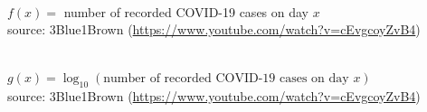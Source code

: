 \documentclass{beamer}
\renewcommand{\alert}[1]{\textcolor{MyTeal}{#1}}
\begin{document}
  \begin{frame}
    \begin{center}
      \\
      $f(x) = $ number of recorded COVID-19 cases on day $x$\\
      \alert{source:} 3Blue1Brown {\tiny (\url{https://www.youtube.com/watch?v=cEvgcoyZvB4})}
      \end{center}
    \end{frame}
    
    \begin{frame}
    \begin{center}
      \\
      $g(x) = \log_{10}(\text{number of recorded COVID-19 cases on day }x)$\\
      \alert{source:} 3Blue1Brown {\tiny (\url{https://www.youtube.com/watch?v=cEvgcoyZvB4})}
      \end{center}
    \end{frame}
\end{document}
